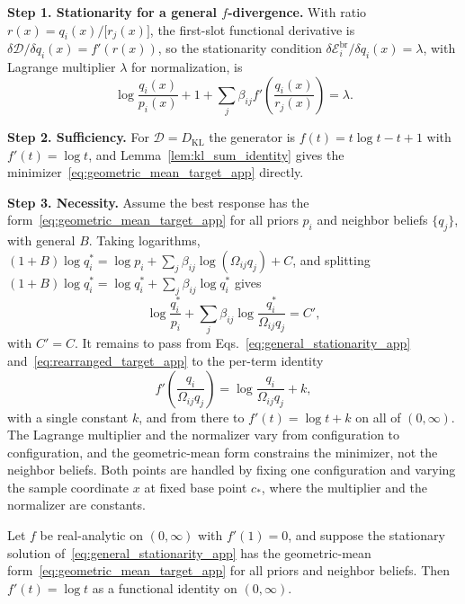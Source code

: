 \textbf{Step 1. Stationarity for a general $f$-divergence.} With ratio $r(x)=q_i(x)/\bigl[r_j(x)\bigr]$, the first-slot functional derivative is $\delta\mathcal{D}/\delta q_i(x) = f'(r(x))$, so the stationarity condition $\delta \mathcal E_i^{\mathrm{br}}/\delta q_i(x)=\lambda$, with Lagrange multiplier $\lambda$ for normalization, is
\begin{equation}
\log\frac{q_i(x)}{p_i(x)} + 1
+ \sum_j \beta_{ij}f'\left(\frac{q_i(x)}{r_j(x)}\right) = \lambda.
\label{eq:general_stationarity_app}
\end{equation}

\textbf{Step 2. Sufficiency.} For $\mathcal{D}=D_{\mathrm{KL}}$ the generator is $f(t)=t\log t - t + 1$ with $f'(t)=\log t$, and Lemma~\ref{lem:kl_sum_identity} gives the minimizer~\eqref{eq:geometric_mean_target_app} directly.

\textbf{Step 3. Necessity.} Assume the best response has the form~\eqref{eq:geometric_mean_target_app} for all priors $p_i$ and neighbor beliefs $\{q_j\}$, with general $B$. Taking logarithms, $(1+B)\log q_i^* = \log p_i + \sum_j\beta_{ij}\log(\Omega_{ij}q_j) + C$, and splitting $(1+B)\log q_i^* = \log q_i^* + \sum_j\beta_{ij}\log q_i^*$ gives
\begin{equation}
\log\frac{q_i^*}{p_i} + \sum_j\beta_{ij}\log\frac{q_i^*}{\Omega_{ij}q_j} = C',
\label{eq:rearranged_target_app}
\end{equation}
with $C'=C$. It remains to pass from Eqs.~\eqref{eq:general_stationarity_app} and~\eqref{eq:rearranged_target_app} to the per-term identity
\begin{equation}
f'\left(\frac{q_i}{\Omega_{ij}q_j}\right) = \log\frac{q_i}{\Omega_{ij}q_j} + k,
\label{eq:ode_app}
\end{equation}
with a single constant $k$, and from there to $f'(t) = \log t + k$ on all of $(0, \infty)$. The Lagrange multiplier and the normalizer vary from configuration to configuration, and the geometric-mean form constrains the minimizer, not the neighbor beliefs. Both points are handled by fixing one configuration and varying the sample coordinate $x$ at fixed base point $c_*$, where the multiplier and the normalizer are constants.

\begin{lemma}
\label{lem:richness_app}
Let $f$ be real-analytic on $(0, \infty)$ with $f'(1) = 0$, and suppose the stationary solution of~\eqref{eq:general_stationarity_app} has the geometric-mean form~\eqref{eq:geometric_mean_target_app} for all priors and neighbor beliefs. Then $f'(t) = \log t$ as a functional identity on $(0, \infty)$.
\end{lemma}

